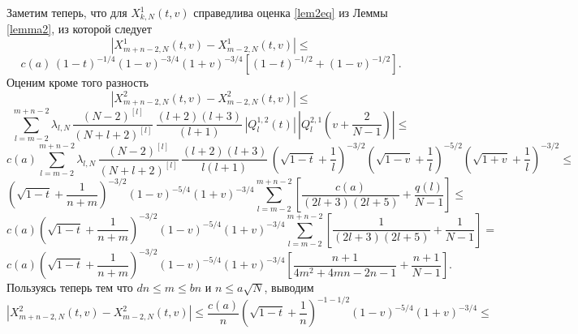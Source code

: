 \documentclass[12pt]{book}
\begin{document}
Заметим теперь, что для $X^{1}_{k,N}(t,v)$ справедлива оценка \eqref{lem2eq} из Леммы \eqref{lemma2}, из которой следует
\begin{equation*}
 \left|
 X^{1}_{m+n-2,N}(t,v) - X^{1}_{m-2,N}(t,v)
 \right| \leq
\end{equation*}
\begin{equation}\label{x1mn}
 c(a) \, (1-t)^{-1/4} (1-v)^{-3/4}(1+v)^{-3/4} \left[
    (1-t)^{-1/2} +
    (1-v)^{-1/2}
    \right].
\end{equation}
Оценим кроме того разность
\begin{equation*}
  \left| X^{2}_{m+n-2,N}(t,v) - X^{2}_{m-2,N}(t,v) \right| \leq
\end{equation*}
\begin{equation*}
   \sum_{l=m-2}^{m+n-2}  \lambda_{l,N}\,
    \frac{(N-2)^{[l]}}{(N+l+2)^{[l]}} \, \frac{(l+2)(l+3)}{(l+1)}\,
    \left| Q^{1,2}_{l}(t) \right|\,\left| Q^{2,1}_{l}\left(v +\frac{2}{N-1} \right)\right|
\leq
\end{equation*}
\begin{equation*}
   c(a)\sum_{l=m-2}^{m+n-2}  \lambda_{l,N}\,
    \frac{(N-2)^{[l]}}{(N+l+2)^{[l]}} \, \frac{(l+2)(l+3)}{l(l+1)}\,
    \left(  \sqrt{1-t} + \frac1l \right)^{-3/2}
    \left(  \sqrt{1-v} + \frac1l \right)^{-5/2}
    \left(  \sqrt{1+v} + \frac1l \right)^{-3/2}
\leq
\end{equation*}
\begin{equation*}
\left(  \sqrt{1-t} + \frac{1}{n+m} \right)^{-3/2}
    \left(1-v\right)^{-5/4}
    \left(1+v \right)^{-3/4}
\sum_{l=m-2}^{m+n-2}
    \left[ \frac{ c(a)}{(2l+3)(2l+5)}+\frac{q(l)}{N-1}\right]
\leq
\end{equation*}
\begin{equation*}
    c(a)
    \left(  \sqrt{1-t} + \frac{1}{n+m} \right)^{-3/2}
    \left(1-v\right)^{-5/4}
    \left(1+v \right)^{-3/4}
\sum_{l=m-2}^{m+n-2}
    \left[ \frac{ 1}{(2l+3)(2l+5)}+\frac{1}{N-1}\right]
   =
\end{equation*}
\begin{equation*}
    c(a)
    \left(  \sqrt{1-t} + \frac{1}{n+m} \right)^{-3/2}
    \left(1-v\right)^{-5/4}
    \left(1+v \right)^{-3/4}
    \left[ \frac{ n+1}{4m^2+4mn-2n-1}+\frac{n+1}{N-1}\right].
\end{equation*}
Пользуясь теперь тем что $dn \leq m \leq bn$ и $n \leq a\sqrt{N}$, выводим
\begin{equation*}
  \left| X^{2}_{m+n-2,N}(t,v) - X^{2}_{m-2,N}(t,v) \right| \leq
    \frac{c(a)}{n}
    \left(  \sqrt{1-t} + \frac{1}{n} \right)^{-1-1/2}
    \left(1-v\right)^{-5/4}
    \left(1+v \right)^{-3/4}
    \leq
\end{equation*}
\end{document}
